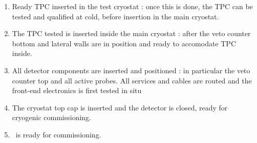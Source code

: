 \begin{enumerate}
\item Ready TPC inserted in the test cryostat : once this is done, the TPC can be tested and qualified at cold, before insertion in the main cryostat.
  
\item The TPC tested is inserted inside the main cryostat : after the veto counter bottom and lateral walls are in position and ready to accomodate TPC inside.

\item All detector components are inserted and positioned : in particular the veto counter top and all active probes. All services and cables are routed and the front-end electronics is first tested in situ

\item The cryostat top cap is inserted and the detector is closed, ready for
cryogenic commissioning.

\item \DSks\ is ready for commissioning.
	
\end{enumerate}
